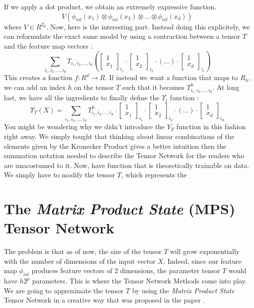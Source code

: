 \documentclass{article}
\theoremstyle{definition}
\theoremstyle{definition}
\begin{document}
If we apply a dot product, we obtain an extremely expressive function.
\[
    V 
    \left(\phi_{ml}(x_1) \otimes \phi_{ml}(x_2)\otimes \dots \otimes \phi_{ml}(x_d) \right)
\]
where $V \in R^{2_d}$.
Now, here is the interesting part. Instead doing this explicitely, we can reformulate the exact same model by using a contraction between a tensor $T$ and the feature map vectors : 
\[
    \sum_{i_1, i_2, \dots, i_d} T_{i_1, i_2, \dots, i_d}
    \left(
    \begin{bmatrix}
        1 \\ x_1
    \end{bmatrix}_{i_1}
    \cdot
    \begin{bmatrix}
        1 \\ x_2
    \end{bmatrix}_{i_2}
    \cdot
    (\dots)
    \cdot
    \begin{bmatrix}
        1 \\ x_d
    \end{bmatrix}_{i_e}
    \right)
\]
This creates a fonction $f: R^d \to R$. If instead we want a function that maps to $R_h$, we can add an index $h$ on the tensor $T$ such that it becomes $T^{h}_{i_1, i_2, \dots, i_d}$. At long last, we have all the ingredients to finally define the $\Upsilon_t$ function :
\[
    \Upsilon_T(X) =     \sum_{i_1, i_2, \dots, i_d} T^{h}_{i_1, i_2, \dots, i_d}
    \cdot
    \begin{bmatrix}
        1 \\ x_1
    \end{bmatrix}_{i_1}
    \cdot
    \begin{bmatrix}
        1 \\ x_2
    \end{bmatrix}_{i_2}
    \cdot
    (\dots)
    \cdot
    \begin{bmatrix}
        1 \\ x_d
    \end{bmatrix}_{i_d}
\]
You might be wondering why we didn't introduce the $Y_T$ function in this fashion right away. We simply tought that thinking about linear combinations of the elements given by the Kronecker Product gives a better intuition then the summation notation needed to describe the Tensor Network for the readers who are unacostumed to it. Now, have function that is theoretically trainable on data. We simply have to modify the tensor $T$, which represents the 

\section{The \emph{Matrix Product State} (MPS) Tensor Network}
The problem is that as of now, the size of the tensor $T$ will grow exponentially with the number of dimensions of the input vector $X$. Indeed, since our feature map $\phi_{ml}$ produces feature vectors of $2$ dimensions, the parameter tensor $T$ would have $h2^p$ parameters. This is where the Tensor Network Methods come into play. We are going to approximate the tensor $T$ by using the \emph{Matrix Product State} Tensor Network in a creative way that was proposed in the paper \cite{stoudenmire2017supervised}.
\end{document}
